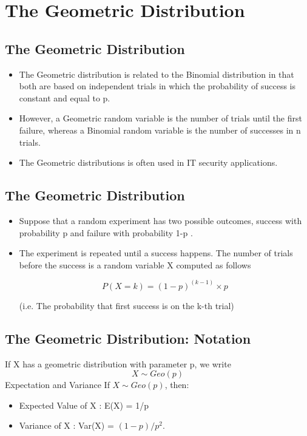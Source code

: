 \documentclass[]{report}
\begin{document}
\section{The Geometric Distribution}
{
	\subsection{The Geometric Distribution}
	\begin{itemize}
		\item The Geometric distribution is related to the Binomial distribution in that
		both are based on independent trials in which the probability of success
		is constant and equal to p.
		\item However, a Geometric random variable is the number of trials until the
		first failure, whereas a Binomial random variable is the number of
		successes in n trials.
		\item The Geometric distributions is often used in IT security applications.
	\end{itemize}
}
{
	\subsection{The Geometric Distribution}
	\begin{itemize}
		\item Suppose that a random experiment has two possible outcomes, success
		with probability p and failure with probability 1-p .
		
		
		\item The experiment is repeated until a success happens. The number of
		trials before the success is a random variable X computed as follows
		
		\[P(X = k) = (1-p)^{(k-1)}\times p \]
		
		
		(i.e. The probability that first success is on the k-th trial)
	\end{itemize}
	
}


{
	\subsection{The Geometric Distribution: Notation}
	
	If X has a geometric distribution with parameter p, we write
	\[X \sim Geo(p) \]
	Expectation and Variance
	If $X \sim Geo(p)$, then:
	
	\begin{itemize}
		\item Expected Value of X : E(X) = 1/p
		\item Variance of X : Var(X) = $(1-p)/p^2$.
	\end{itemize}
}

	
\end{document}
